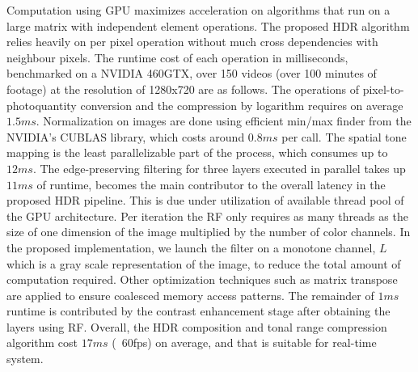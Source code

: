 Computation using GPU maximizes acceleration on algorithms that run on a large matrix with 
independent element operations. The proposed HDR algorithm relies heavily on per pixel operation 
without much cross dependencies with neighbour pixels. The runtime cost of each operation in 
milliseconds, benchmarked on a NVIDIA 460GTX, over 150 videos (over 100 minutes of footage) at 
the resolution of 1280x720 are as follows. The operations of pixel-to-photoquantity conversion and 
the compression by logarithm requires on average $1.5ms$. Normalization on images are done using 
efficient min/max finder from the NVIDIA's CUBLAS library, which costs around $0.8ms$ per call. The 
spatial tone mapping is the least parallelizable part of the process, which consumes up to $12ms$. 
The edge-preserving filtering for three layers executed in parallel takes up $11ms$ of runtime, 
becomes the main contributor to the overall latency in the proposed HDR pipeline. This is due under 
utilization of available thread pool of the GPU architecture. Per iteration the RF only requires as many 
threads as the size of one dimension of the image multiplied by the number of color channels. In the 
proposed implementation, we launch the filter on a monotone channel, $L$ which is a gray scale 
representation of the image, to reduce the total amount of computation required. Other optimization 
techniques such as matrix transpose are applied to ensure coalesced memory access patterns. The 
remainder of $1ms$ runtime is contributed by the contrast enhancement stage after obtaining the 
layers using RF. Overall, the HDR composition and tonal range compression algorithm cost $17ms$ 
(~60fps) on average, and that is suitable for real-time system. 


